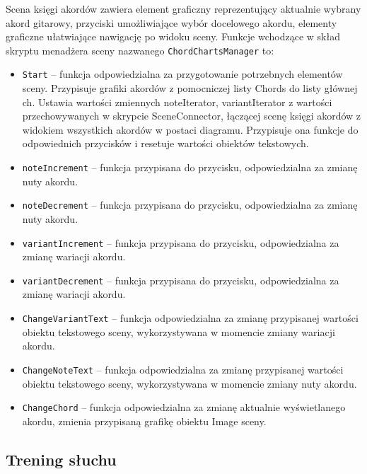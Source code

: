 Scena księgi akordów zawiera element graficzny reprezentujący aktualnie wybrany akord gitarowy, przyciski umożliwiające wybór docelowego akordu, elementy graficzne ułatwiające nawigację po widoku sceny. Funkcje wchodzące w skład skryptu menadżera sceny nazwanego \texttt{ChordChartsManager} to:

\begin{itemize}
    \item \texttt{Start} -- funkcja odpowiedzialna za przygotowanie potrzebnych elementów sceny. Przypisuje grafiki akordów z pomocniczej listy Chords do listy głównej ch. Ustawia wartości zmiennych noteIterator, variantIterator z wartości przechowywanych w skrypcie SceneConnector, łączącej scenę księgi akordów z widokiem wszystkich akordów w postaci diagramu. Przypisuje ona funkcje do odpowiednich przycisków i resetuje wartości obiektów tekstowych.
    \item \texttt{noteIncrement} -- funkcja przypisana do przycisku, odpowiedzialna za zmianę nuty akordu.
    \item \texttt{noteDecrement} -- funkcja przypisana do przycisku, odpowiedzialna za zmianę nuty akordu.
    \item \texttt{variantIncrement} -- funkcja przypisana do przycisku, odpowiedzialna za zmianę wariacji akordu.
    \item \texttt{variantDecrement} -- funkcja przypisana do przycisku, odpowiedzialna za zmianę wariacji akordu.
    \item \texttt{ChangeVariantText} -- funkcja odpowiedzialna za zmianę przypisanej wartości obiektu tekstowego sceny, wykorzystywana w momencie zmiany wariacji akordu.
    \item \texttt{ChangeNoteText} -- funkcja odpowiedzialna za zmianę przypisanej wartości obiektu tekstowego sceny, wykorzystywana w momencie zmiany nuty akordu.
    \item \texttt{ChangeChord} -- funkcja odpowiedzialna za zmianę aktualnie wyświetlanego akordu, zmienia przypisaną grafikę obiektu Image sceny.
\end{itemize}

\subsection{Trening słuchu}

